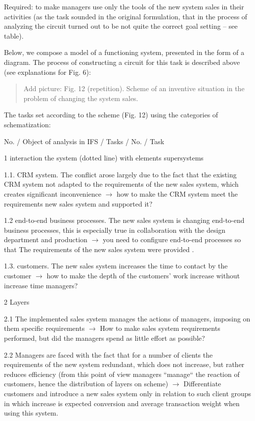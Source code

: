 \documentclass[11pt,a4paper]{book}
\newcommand{\addpicture}[1]{
  \begin{quote} Add picture: #1\end{quote}
}
\begin{document}
Required: to make managers use only the tools of the new system sales in their
activities (as the task sounded in the original formulation, that in the
process of analyzing the circuit turned out to be not quite the correct goal
setting -- see table).

Below, we compose a model of a functioning system, presented in the form of a
diagram.  The process of constructing a circuit for this task is described
above (see explanations for Fig. 6):

\addpicture{Fig. 12 (repetition). Scheme of an inventive situation in the
  problem of changing the system sales.}

The tasks set according to the scheme (Fig. 12) using the categories of
schematization:


No. / Object of analysis in IFS / Tasks / No. / Task

1 interaction the system (dotted line) with elements supersystems

1.1.  CRM system. The conflict arose largely due to the fact that the existing
CRM system not adapted to the requirements of the new sales system, which
creates significant inconvenience $\to$ how to make the CRM system meet the
requirements new sales system and supported it?

1.2 end-to-end business processes. The new sales system is changing end-to-end
business processes, this is especially true in collaboration with the design
department and production $\to$ you need to configure end-to-end processes so
that The requirements of the new sales system were provided .

1.3.  customers. The new sales system increases the time to contact by the
customer $\to$ how to make the depth of the customers' work increase without
increase time managers?

2 Layers

2.1 The implemented sales system manages the actions of managers, imposing on
them specific requirements $\to$ How to make sales system requirements
performed, but did the managers spend as little effort as possible?

2.2 Managers are faced with the fact that for a number of clients the
requirements of the new system redundant, which does not increase, but rather
reduces efficiency (from this point of view managers “manage“ the reaction of
customers, hence the distribution of layers on scheme) $\to$ Differentiate
customers and introduce a new sales system only in relation to such client
groups in which increase is expected conversion and average transaction weight
when using this system.
\end{document}
